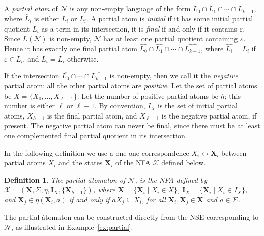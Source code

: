 \documentclass[preprint,12pt]{elsarticle}
\newcommand{\ol}{\overline}
\newcommand{\eps}{\varepsilon}
\newcommand{\Sig}{\Sigma}
\newcommand{\cN}{{\mathcal N}}
\newcommand{\cX}{{\mathcal X}}
\newtheorem{definition}{Definition}
\begin{document}
A \emph{partial atom} of $\cN$ is any non-empty language 
of the form 
$\widetilde{L_0}\cap\widetilde{L_1}\cap \cdots \cap \widetilde{L_{k-1}}$, 
where $\widetilde{L_i}$ is either $L_i$ or $\ol{L_i}$.
A partial atom is \emph{initial} if it has some initial partial quotient 
$L_i$ as a term in its intersection, 
it is \emph{final} if and only if it contains $\eps$.
Since $L(\cN)$ is non-empty, $\cN$ has at least one partial quotient containing $\eps$. 
Hence it has exactly one final partial atom
$\widehat{L_0}\cap\widehat{L_1}\cap \cdots \cap \widehat{L_{k-1}}$, where 
$\widehat{L_i}=L_i$ if $\eps\in L_i$, and $\widehat{L_i}=\ol{L_i}$ otherwise.

If the intersection 
$\ol{L_0}\cap \cdots \cap \ol{L_{k-1}}$ is non-empty, then we call it 
the \emph{negative} partial atom; all the other partial atoms are \emph{positive}. 
Let the set of partial atoms be $X=\{X_0,\ldots,X_{\ell -1}\}$. 
Let the number of positive partial atoms be $h$; this number is either $\ell$ or $\ell-1$.
By convention, $I_X$ is the set of initial partial atoms,
$X_{h -1}$ is the final partial atom, and $X_{\ell-1}$ is the negative partial atom, if  present.
The negative partial atom can never be final, 
since there must be at least one complemented final partial quotient in its intersection.

In the following definition we use a one-one correspondence 
$X_i \leftrightarrow  {\mathbf X}_i$ between partial atoms $X_i$ and the states 
${\mathbf X}_i$ of the NFA $\cX$ defined below.

\begin{definition}
\label{def:partial_atomaton}
The \emph{partial \'atomaton} of  $\cN$, is the NFA defined by 
$\cX=({\mathbf X},\Sig,\eta, {\mathbf I_X},\{{\mathbf X}_{h -1}\})$,
 where ${\mathbf X}=\{{\mathbf X}_i\mid X_i\in X\}$,
 ${\mathbf I_X}=\{{\mathbf X}_i\mid X_i\in I_X\}$, 
 and ${\mathbf X}_j \in \eta({\mathbf X}_i, a)$ if and only if 
$aX_j \subseteq X_i$, 
for all ${\mathbf X_i},{\mathbf X_j}\in {\mathbf X}$ and $a\in\Sig$.
\end{definition}


The partial \'atomaton can be constructed directly from the NSE corresponding to $\cN$, as illustrated in Example~\ref{ex:partial}.
\end{document}
